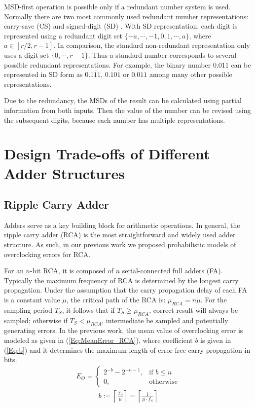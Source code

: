 \documentclass[10pt, conference, compsocconf]{IEEEtran}
\begin{document}
MSD-first operation is possible only if a redundant number system is used. Normally there are two most commonly used redundant number representations: carry-save (CS) \cite{CSadder} and signed-digit (SD) \cite{RedundantNumber}. With SD representation, each digit is represented using a redundant digit set $\{-a, \cdots,-1,0, 1, \cdots, a\}$, where $a\in[r/2,r-1]$. In comparison, the standard non-redundant representation only uses a digit set $\{0,\cdots,r-1\}$. Thus a standard number corresponds to several possible redundant representations. For example, the binary number $0.011$ can be represented in SD form as $0.1\overline{1}1$, $0.10\overline{1}$ or $0.011$ among many other possible representations.

Due to the redundancy, the MSDs of the result can be calculated using partial information from both inputs. Then the value of the number can be revised using the subsequent digits, because each number has multiple representations.

\section{Design Trade-offs of Different Adder Structures}
\subsection{Ripple Carry Adder}
Adders serve as a key building block for arithmetic operations. In general, the ripple carry adder (RCA) is the most straightforward and widely used adder structure. As such, in our previous work we proposed probabilistic models of overclocking errors for RCA.

For an $n$-bit RCA, it is composed of $n$ serial-connected full adders (FA). Typically the maximum frequency of RCA is determined by the longest carry propagation. Under the assumption that the carry propagation delay of each FA is a constant value $\mu$, the critical path of the RCA is: $\mu_{RCA}=n\mu$. For the sampling period $T_S$, it follows that if $T_S\geqslant\mu_{RCA}$, correct result will always be sampled; otherwise if $T_S<\mu_{RCA}$, intermediate be sampled and potentially generating errors. In the previous work, the mean value of overclocking error is modeled as given in (\ref{Eq:MeanError_RCA}), where coefficient $b$ is given in (\ref{Eq:b}) and it determines the maximum length of error-free carry propagation in bits.
%
\begin{eqnarray}\label{Eq:MeanError_RCA}
    E_O=\left\{
        \begin{matrix}
            2^{-b}-2^{-n-1}, & \textrm{if $b\leq n$}\\
            0, & \textrm{otherwise}
        \end{matrix}
        \right.
\end{eqnarray}
%
\begin{eqnarray}\label{Eq:b}
    b:=\left\lceil \frac{T_S}{\mu} \right\rceil=\left\lceil \frac{1}{\mu\cdot f_S}\right\rceil
\end{eqnarray}
\end{document}
